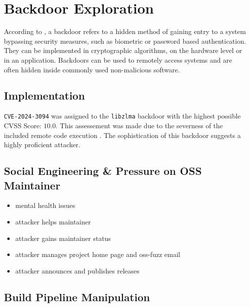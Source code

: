 \section{Backdoor Exploration}

According to \cite{wysopal2007static}, a backdoor refers to a hidden method of
gaining entry to a system bypassing security measures, such as biometric or
password based authentication. They can be implemented in cryptographic
algorithms, on the hardware level or in an application. Backdoors can be used
to remotely access systems and are often hidden inside commonly used
non-malicious software.

\subsection{Implementation}

\texttt{CVE-2024-3094} was assigned to the \texttt{libzlma} backdoor with the
highest possible CVSS Score: $10.0$. This assessement was made due to the
severness of the included remote code execution \cite{redhat2024cve}. The
sophistication of this backdoor suggests a highly proficient attacker.

\subsection{Social Engineering \& Pressure on OSS Maintainer}

\begin{itemize}
    \item mental health issues
    \item attacker helps maintainer
    \item attacker gains maintainer status
    \item attacker manages project home page and oss-fuzz email
    \item attacker announces and publishes releases
\end{itemize}

\subsection{Build Pipeline Manipulation}

